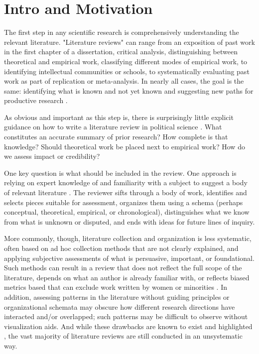 \documentclass{cup-pan}
\begin{document}
\section*{Intro and Motivation}

The first step in any scientific research is comprehensively understanding the relevant literature. "Literature reviews" can range from an exposition of past work in the first chapter of a dissertation, critical analysis, distinguishing between theoretical and empirical work, classifying different modes of empirical work, to identifying intellectual communities or schools, to systematically evaluating past work as part of replication or meta-analysis. In nearly all cases, the goal is the same: identifying what is known and not yet known and suggesting new paths for productive research \citep{knopf_doing_2006}. 

As obvious and important as this step is, there is surprisingly little explicit guidance on how to write a literature review in political science \citep{knopf_doing_2006}. What constitutes an accurate summary of prior research? How complete is that knowledge? Should theoretical work be placed next to empirical work? How do we assess impact or credibility?

One key question is what should be included in the review.   One approach is relying on expert knowledge of and familiarity with a subject to suggest a body of relevant literature \citep{mcghee_partisan_2020}. The reviewer sifts through a body of work, identifies and selects pieces suitable for assessment, organizes them using a schema (perhaps conceptual, theoretical, empirical, or chronological), distinguishes what we know from what is unknown or disputed, and ends with ideas for future lines of inquiry.

More commonly, though, literature collection and organization is less systematic, often based on ad hoc collection methods that are not clearly explained, and applying subjective assessments of what is persuasive, important, or foundational. Such methods can result in a review that does not reflect the full scope of the literature, depends on what an author is already familiar with, or reflects biased metrics based that can exclude work written by women or minorities \citep{dion_gendered_2018}. In addition, assessing patterns in the literature without guiding principles or organizational schemata may obscure how different research directions have interacted and/or overlapped; such patterns may be difficult to observe without visualization aids. And while these drawbacks are known to exist and highlighted \citep[indeed, guidelines for a quality literature review often include a call for transparency in inclusion criteria, such as in ][]{snyder_literature_2019}, the vast majority of literature reviews are still conducted in an unsystematic way.
\end{document}
